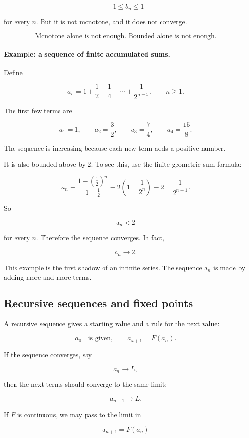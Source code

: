 \[
-1\le b_n\le1
\]

for every \(n\).  But it is not monotone, and it does not converge.

\[
\boxed{
\text{Monotone alone is not enough.  Bounded alone is not enough.}
}
\]

\paragraph{Example: a sequence of finite accumulated sums.}
Define

\[
a_n=1+\frac12+\frac14+\cdots+\frac1{2^{n-1}},
\qquad n\ge1.
\]

The first few terms are

\[
a_1=1,
\qquad
a_2=\frac32,
\qquad
a_3=\frac74,
\qquad
a_4=\frac{15}{8}.
\]

The sequence is increasing because each new term adds a positive number.

It is also bounded above by \(2\).  To see this, use the finite geometric sum formula:

\[
a_n
=
\frac{1-\left(\frac12\right)^n}{1-\frac12}
=
2\left(1-\frac1{2^n}\right)
=
2-\frac1{2^{n-1}}.
\]

So

\[
a_n<2
\]

for every \(n\).  Therefore the sequence converges.  In fact,

\[
a_n\to2.
\]

This example is the first shadow of an infinite series.  The sequence \(a_n\) is made by
adding more and more terms.

\subsection{Recursive sequences and fixed points}
\label{subsec:recursive-sequences-fixed-points}

A recursive sequence gives a starting value and a rule for the next value:

\[
a_0 \quad\text{is given},
\qquad
a_{n+1}=F(a_n).
\]

If the sequence converges, say

\[
a_n\to L,
\]

then the next terms should converge to the same limit:

\[
a_{n+1}\to L.
\]

If \(F\) is continuous, we may pass to the limit in

\[
a_{n+1}=F(a_n)
\]

